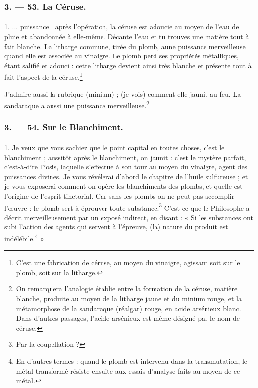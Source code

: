\documentclass[landscape, a4paper, 11pt, oneside, polutonikogreek, french]{article}
\begin{document}
\bigskip
\centerline{\EightStarTaper}
\centerline{\EightStarTaper\EightStarTaper}
\bigskip

\subsubsection{3. --- 53. La Céruse.}
\paragraph{}
1. ... puissance ; après l'opération, la céruse est adoucie au moyen de l'eau de pluie et abandonnée à elle-même. Décante l'eau et tu trouves une matière tout à fait blanche. La litharge commune, tirée du plomb, aune puissance merveilleuse quand elle est associée au vinaigre. Le plomb perd ses propriétés métalliques, étant salifié et adouci : cette litharge devient ainsi très blanche et présente tout à fait l'aspect de la céruse.\footnote{C'est une fabrication de céruse, au moyen du vinaigre, agissant soit sur le plomb, soit sur la litharge.}

J'admire aussi la rubrique (minium) ; (je vois) comment elle jaunit au feu. La sandaraque a aussi une puissance merveilleuse.\footnote{On remarquera l'analogie établie entre la formation de la céruse, matière blanche, produite au moyen de la litharge jaune et du minium rouge, et la métamorphose de la sandaraque (réalgar) rouge, en acide arsénieux blanc. Dans d'autres passages, l'acide arsénieux est même désigné par le nom de céruse.}

\bigskip
\centerline{\EightStarTaper}
\centerline{\EightStarTaper\EightStarTaper}
\bigskip

\subsubsection{3. --- 54. Sur le Blanchiment.}
\paragraph{}
1. Je veux que vous sachiez que le point capital en toutes choses, c'est le blanchiment ; aussitôt après le blanchiment, on jaunit : c'est le mystère parfait, c'est-à-dire l'iosis, laquelle s'effectue à son tour au moyen du vinaigre, agent des puissances divines. Je vous révélerai d'abord le chapitre de l'huile sulfureuse ; et je vous exposerai comment on opère les blanchiments des plombs, et quelle est l'origine de l'esprit tinctorial. Car sans les plombs on ne peut pas accomplir l'œuvre : le plomb sert à éprouver toute substance.\footnote{Par la coupellation ?} C'est ce que le Philosophe a décrit merveilleusement par un exposé indirect, en disant : « Si les substances ont subi l'action des agents qui servent à l'épreuve, (la) nature du produit est indélébile.\footnote{En d'autres termes : quand le plomb est intervenu dans la transmutation, le métal transformé résiste ensuite aux essais d'analyse faits au moyen de ce métal.} »
\end{document}
